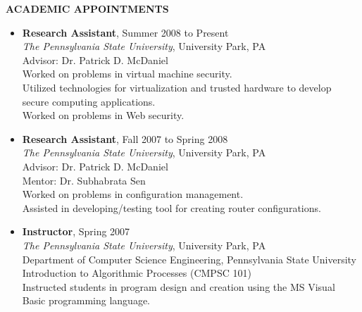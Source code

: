 \documentclass[10pt]{article}
\begin{document}
\vspace{1em} {\large \textbf{ACADEMIC APPOINTMENTS}}
\begin{itemize}
\item \textbf{Research Assistant}, Summer 2008 to Present\\
  \textit{The Pennsylvania State University},
  University Park, PA\\
  Advisor: Dr. Patrick D. McDaniel\\
  Worked on problems in virtual machine security.\\
  Utilized technologies for virtualization and trusted hardware to develop secure computing applications.\\
  Worked on problems in Web security.

\item \textbf{Research Assistant}, Fall 2007 to Spring 2008\\
  \textit{The Pennsylvania State University},
  University Park, PA\\
  Advisor: Dr. Patrick D. McDaniel\\
  Mentor: Dr. Subhabrata Sen\\
  Worked on problems in configuration management.\\
  Assisted in developing/testing tool for creating router configurations.

\item \textbf{Instructor}, Spring 2007\\
  \textit{The Pennsylvania State University},
  University Park, PA\\
  Department of Computer Science Engineering, Pennsylvania State University\\
  Introduction to Algorithmic Processes (CMPSC 101)\\
  Instructed students in program design and creation using the MS Visual Basic programming language.
\end{itemize}
\end{document}
